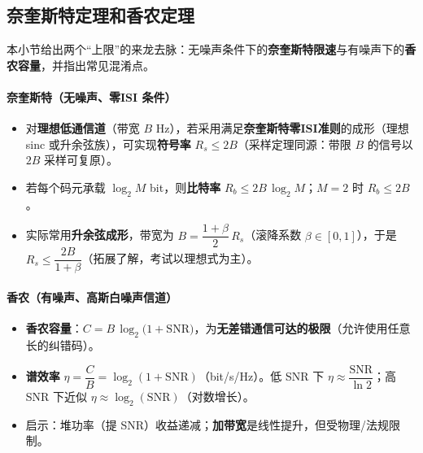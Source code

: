 \documentclass[lang=cn,newtx,10pt,scheme=chinese]{../../elegantbook}
\begin{document}
\subsection{奈奎斯特定理和香农定理}
本小节给出两个“上限”的来龙去脉：无噪声条件下的\textbf{奈奎斯特限速}与有噪声下的\textbf{香农容量}，并指出常见混淆点。

\paragraph{奈奎斯特（无噪声、零ISI 条件）}
\begin{itemize}
    \item 对\textbf{理想低通信道}（带宽 $B$ Hz），若采用满足\textbf{奈奎斯特零ISI准则}的成形（理想 sinc 或升余弦族），可实现\textbf{符号率} $R_s\le 2B$（采样定理同源：带限 $B$ 的信号以 $2B$ 采样可复原）。
    \item 若每个码元承载 $\log_2 M$ bit，则\textbf{比特率} $\boxed{R_b\le 2B\,\log_2 M}$；$M=2$ 时 $R_b\le 2B$。
    \item 实际常用\textbf{升余弦成形}，带宽为 $B=\dfrac{1+\beta}{2}\,R_s$（滚降系数 $\beta\in[0,1]$），于是 $R_s\le \dfrac{2B}{1+\beta}$（拓展了解，考试以理想式为主）。
\end{itemize}
\begin{center}
%
\end{center}

\paragraph{香农（有噪声、高斯白噪声信道）}
\begin{itemize}
    \item \textbf{香农容量}：$\boxed{C=B\,\log_2\!\bigl(1+\mathrm{SNR}\bigr)}$，为\textbf{无差错通信可达的极限}（允许使用任意长的纠错码）。
    \item \textbf{谱效率} $\eta=\dfrac{C}{B}=\log_2(1+\mathrm{SNR})$（bit/s/Hz）。低 SNR 下 $\eta\approx \dfrac{\mathrm{SNR}}{\ln 2}$；高 SNR 下近似 $\eta\approx \log_2(\mathrm{SNR})$（对数增长）。
    \item 启示：堆功率（提 SNR）收益递减；\textbf{加带宽}是线性提升，但受物理/法规限制。
\end{itemize}
\end{document}
